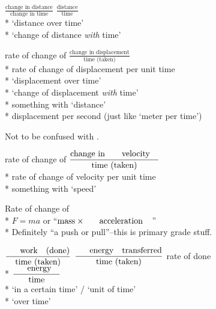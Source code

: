 
\begin{question}%

  $\frac{\text{change in distance}}{\text{change in time}}$ \OR $\frac{\text{distance}}{\text{time}}$~\hfill{}\vspace{0.5em}\\*
  \AVOID `distance over time'\\*
  \NOT `change of distance \textit{with} time'
\end{question}

\begin{question}%

  rate of change of  \OR $\frac{\text{change in displacement}}{\text{time (taken)}}$~\hfill{}\\*
  \NOT rate of change of displacement per unit time\\*
  \AVOID `displacement over time'\\*
  \NOT `change of displacement \textit{with} time'\\*
  \NOT something with `distance'\\*
  \NOT displacement per second (just like \NOT `meter per time')

  Not to be confused with .
\end{question}

\begin{question}%

  rate of change of  \OR $\frac{\text{change in \refterm{velocity}}}{\text{time (taken)}}$~\hfill{}\\*
  \NOT rate of change of velocity per unit time\\*
  \NOT something with `speed'
\end{question}

\begin{question}%

  Rate of change of ~\hfill{}\\*
  \NOT $F = ma$ or ``$\text{mass} \times \text{\refterm{acceleration}}$''\\*
  Definitely \NOT ``a push or pull''--this is primary grade stuff.
\end{question}

\begin{question}%

  $\frac{\text{\refterm{work} (done)}}{\text{time (taken)}}$ \OR $\frac{\text{\refterm{energy} transferred}}{\text{time (taken)}}$ \OR rate of  done~\hfill{} \vspace{0.5em}\\*
  \NOT $\frac{\text{\refterm{energy}}}{\text{time}}$ \\*
  \AVOID `in a certain time' / `unit of time' \\*
  \AVOID `over time'
\end{question}

